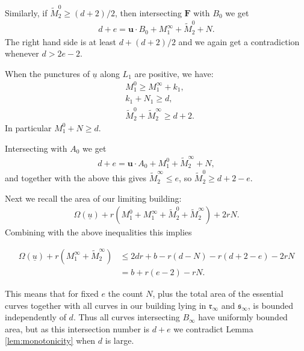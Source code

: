 \documentclass[12pt]{amsart}
\theoremstyle{definition}
\begin{document}
Similarly, if $\widetilde{M}^0_2 \ge (d+2)/2$, then intersecting $\mathbf{F}$ with $B_0$ we get
\begin{align*}
    d+e = \mathbf{u} \cdot B_0 + M_1^\infty + \widetilde{M}^0_2 +N. 
\end{align*}
The right hand side is at least $d + (d+2)/2$ and we again get a contradiction whenever  $d> 2e-2$. 





\bigskip

 When the punctures of $\underline{u}$ along $L_1$ are positive, we have:
\begin{align*}
    &M_1^0 \geq M_1^\infty + k_1,\\
    &k_1 +N_1 \geq d,\\
    &\widetilde{M}^0_2+\widetilde{M}^\infty_2   \geq d+2.
 \end{align*}
In particular $M_1^0 + N \ge d$.

Intersecting with $A_0$ we get
\begin{align*}
    d+e = \mathbf{u} \cdot A_0 + M_1^0 + \widetilde{M}^\infty_2 +N,
\end{align*}
and together with the above this gives $\widetilde{M}^\infty_2 \le e$, so $\widetilde{M}^0_2 \ge d+2-e$.

Next we recall the area of our limiting building:
\begin{align*}
\Omega(\underline{u}) + r(M_1^0 + M_1^{\infty}+ \widetilde{M}^0_2+\widetilde{M}^\infty_2) + 2rN.
\end{align*}
Combining with the above inequalities this implies

\begin{align*}
\Omega(\underline{u}) + r(M_1^{\infty}+\widetilde{M}^\infty_2) 
&\leq 2dr + b - r(d - N) -r(d+2-e) - 2rN\\ &= b +r(e-2) - rN.
\end{align*}

This means that for fixed $e$ the count $N$, plus the total area of the essential curves together with all curves in our building lying in $\mathfrak{r}_{\infty}$ and $\mathfrak{s}_{\infty}$, is bounded independently of $d$. Thus all curves intersecting $B_{\infty}$ have uniformly bounded area, but as this intersection number is $d+e$ we contradict Lemma \ref{lem:monotonicity} when $d$ is large.
\end{document}
